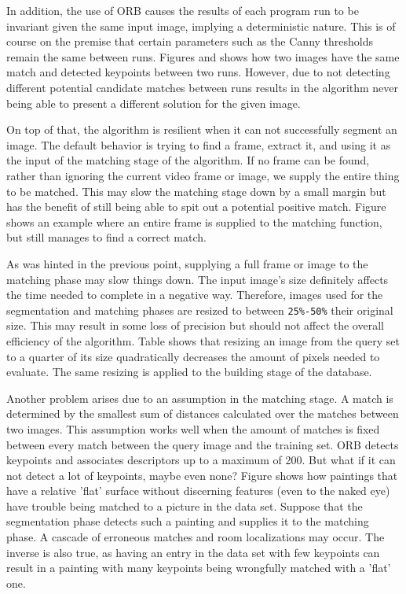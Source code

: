	
	In addition, the use of ORB causes the results of each program run to be invariant given the same input image, implying a deterministic nature. This is of course on the premise that certain parameters such as the Canny thresholds remain the same between runs. Figures  and  shows how two images have the same match and detected keypoints between two runs. However, due to not detecting different potential candidate matches between runs results in the algorithm never being able to present a different solution for the given image.
	
	
	On top of that, the algorithm is resilient when it can not successfully segment an image. The default behavior is trying to find a frame, extract it, and using it as the input of the matching stage of the algorithm. If no frame can be found, rather than ignoring the current video frame or image, we supply the entire thing to be matched. This may slow the matching stage down by a small margin but has the benefit of still being able to spit out a potential positive match. Figure  shows an example where an entire frame is supplied to the matching function, but still manages to find a correct match.
	
	
	As was hinted in the previous point, supplying a full frame or image to the matching phase may slow things down. The input image's size definitely affects the time needed to complete in a negative way. Therefore, images used for the segmentation and matching phases are resized to between \verb|25%-50%| their original size. This may result in some loss of precision but should not affect the overall efficiency of the algorithm. Table  shows that resizing an image from the query set to a quarter of its size quadratically decreases the amount of pixels needed to evaluate. The same resizing is applied to the building stage of the database.
	
	
	Another problem arises due to an assumption in the matching stage. A match is determined by the smallest sum of distances calculated over the matches between two images. This assumption works well when the amount of matches is fixed between every match between the query image and the training set. ORB detects keypoints and associates descriptors up to a maximum of 200. But what if it can not detect a lot of keypoints, maybe even none? Figure  shows how paintings that have a relative 'flat' surface without discerning features (even to the naked eye) have trouble being matched to a picture in the data set. Suppose that the segmentation phase detects such a painting and supplies it to the matching phase. A cascade of erroneous matches and room localizations may occur. The inverse is also true, as having an entry in the data set with few keypoints can result in a painting with many keypoints being wrongfully matched with a 'flat' one.
	
